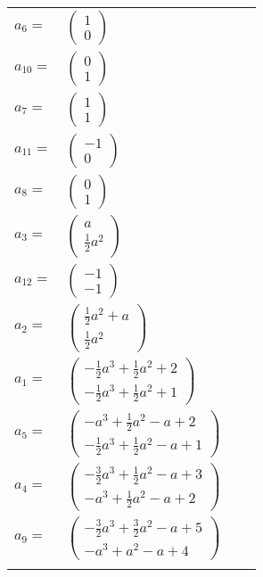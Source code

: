 \documentclass[1p]{elsarticle_modified}
\theoremstyle{definition}
\begin{document}
\begin{tabular}{m{7pt} m{180pt} m{7pt} m{180pt} }
\flushright $a_{6}=$&$\begin{pmatrix}1\\0\end{pmatrix}$ \\
\flushright $a_{10}=$&$\begin{pmatrix}0\\1\end{pmatrix}$ \\
\flushright $a_{7}=$&$\begin{pmatrix}1\\1\end{pmatrix}$ \\
\flushright $a_{11}=$&$\begin{pmatrix}-1\\0\end{pmatrix}$ \\
\flushright $a_{8}=$&$\begin{pmatrix}0\\1\end{pmatrix}$ \\
\flushright $a_{3}=$&$\begin{pmatrix}a\\\frac{1}{2} a^2\end{pmatrix}$ \\
\flushright $a_{12}=$&$\begin{pmatrix}-1\\-1\end{pmatrix}$ \\
\flushright $a_{2}=$&$\begin{pmatrix}\frac{1}{2} a^2+a\\\frac{1}{2} a^2\end{pmatrix}$ \\
\flushright $a_{1}=$&$\begin{pmatrix}-\frac{1}{2} a^3+\frac{1}{2} a^2+2\\-\frac{1}{2} a^3+\frac{1}{2} a^2+1\end{pmatrix}$ \\
\flushright $a_{5}=$&$\begin{pmatrix}- a^3+\frac{1}{2} a^2- a+2\\-\frac{1}{2} a^3+\frac{1}{2} a^2- a+1\end{pmatrix}$ \\
\flushright $a_{4}=$&$\begin{pmatrix}-\frac{3}{2} a^3+\frac{1}{2} a^2- a+3\\- a^3+\frac{1}{2} a^2- a+2\end{pmatrix}$ \\
\flushright $a_{9}=$&$\begin{pmatrix}-\frac{3}{2} a^3+\frac{3}{2} a^2- a+5\\- a^3+a^2- a+4\end{pmatrix}$\\&\end{tabular}
\end{document}
